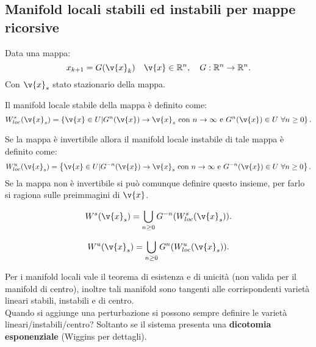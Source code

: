 \subsection{Manifold locali stabili ed instabili per mappe ricorsive}%
Data una mappa:
    \[
	x_{k+1}=G(\v{x}_k) \quad  \v{x}\in \mathbb{R}^n, \quad  G:\mathbb{R}^n\to \mathbb{R}^n
    .\] 
Con $\v{x}_s$ stato stazionario della mappa. 
\begin{defn}
Il manifold locale stabile della mappa è definito come:
\[
    W_{loc}^s(\v{x}_s) = \left\{\v{x}\in U | G^n(\v{x}) \to \v{x}_s \text{ con } n\to \infty \text{ e } G^n(\v{x}) \in U \ \forall n \ge 0\right\}
.\] 
\end{defn}
\noindent
\begin{defn}
Se la mappa è invertibile allora il manifold locale instabile di tale mappa è definito come:
\[
    W_{loc}^u(\v{x}_s) = \left\{\v{x}\in U | G^{-n}(\v{x}) \to \v{x}_s \text{ con } n\to \infty \text{ e } G^{-n}(\v{x}) \in U \ \forall n \ge 0\right\}
.\] 
Se la mappa non è invertibile si può comunque definire questo insieme, per farlo si ragiona sulle preimmagini di $\v{x}$.
\end{defn}
\noindent
\begin{defn}
    \[
	W^s(\v{x}_s) = \bigcup_{n\ge 0} G^{-n}(W_{loc}^s(\v{x}_s) ) 
    .\] 
\end{defn}
\noindent
\begin{defn}
    \[
	W^u(\v{x}_s) = \bigcup_{n\ge 0} G^{n}(W_{loc}^u(\v{x}_s) ) 
    .\] 
\end{defn}
\noindent
Per i manifold locali vale il teorema di esistenza e di unicità (non valida per il manifold di centro), inoltre tali manifold sono tangenti alle corrispondenti varietà lineari stabili, instabili e di centro.\\
Quando si aggiunge una perturbazione si possono sempre definire le varietà lineari/instabili/centro? Soltanto se il sistema presenta una \textbf{dicotomia esponenziale} (Wiggins per dettagli).
